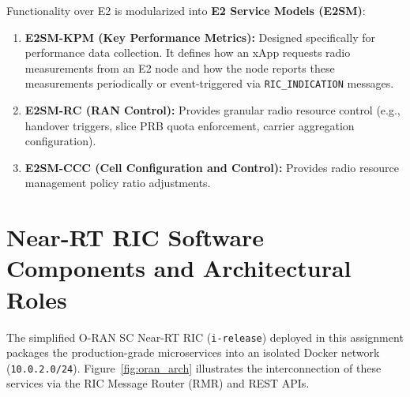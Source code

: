 \documentclass[11pt,a4paper]{article}
\begin{document}
Functionality over E2 is modularized into \textbf{E2 Service Models (E2SM)}:
\begin{enumerate}
    \item \textbf{E2SM-KPM (Key Performance Metrics):} Designed specifically for performance data collection. It defines how an xApp requests radio measurements from an E2 node and how the node reports these measurements periodically or event-triggered via \texttt{RIC\_INDICATION} messages.
    \item \textbf{E2SM-RC (RAN Control):} Provides granular radio resource control (e.g., handover triggers, slice PRB quota enforcement, carrier aggregation configuration).
    \item \textbf{E2SM-CCC (Cell Configuration and Control):} Provides radio resource management policy ratio adjustments.
\end{enumerate}

\section{Near-RT RIC Software Components and Architectural Roles}

The simplified O-RAN SC Near-RT RIC (\texttt{i-release}) deployed in this assignment packages the production-grade microservices into an isolated Docker network (\texttt{10.0.2.0/24}). Figure~\ref{fig:oran_arch} illustrates the interconnection of these services via the RIC Message Router (RMR) and REST APIs.
\end{document}

